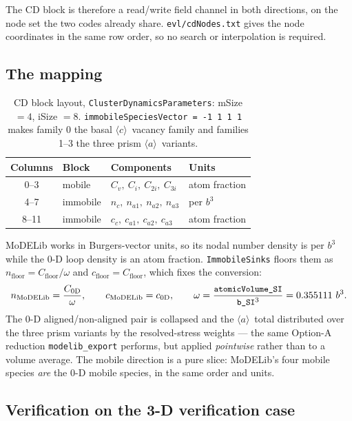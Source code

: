 \documentclass[11pt,a4paper]{article}
\newcommand{\code}[1]{\texttt{\small #1}}
\newcommand{\aloop}{\ensuremath{\langle a\rangle}}
\newcommand{\cloop}{\ensuremath{\langle c\rangle}}
\begin{document}
The CD block is therefore a read/write field channel in both directions, on the
node set the two codes already share. \code{evl/cdNodes.txt} gives the node
coordinates in the same row order, so no search or interpolation is required.

\subsection{The mapping}

\begin{table}[htb]
\centering
\caption{CD block layout, \code{ClusterDynamicsParameters}: mSize $=4$,
iSize $=8$. \code{immobileSpeciesVector = -1 1 1 1} makes family 0 the basal
\cloop\ vacancy family and families 1--3 the three prism \aloop\ variants.}
\begin{tabular}{clll}
\toprule
Columns & Block & Components & Units \\
\midrule
0--3   & mobile   & $C_v,\ C_i,\ C_{2i},\ C_{3i}$ & atom fraction \\
4--7   & immobile & $n_c,\ n_{a1},\ n_{a2},\ n_{a3}$ & per $b^3$ \\
8--11  & immobile & $c_c,\ c_{a1},\ c_{a2},\ c_{a3}$ & atom fraction \\
\bottomrule
\end{tabular}
\end{table}

MoDELib works in Burgers-vector units, so its nodal number density is per $b^3$
while the 0-D loop density is an atom fraction. \code{ImmobileSinks} floors them
as $n_{\mathrm{floor}}=C_{\mathrm{floor}}/\omega$ and
$c_{\mathrm{floor}}=C_{\mathrm{floor}}$, which fixes the conversion:
\begin{equation}
n_{\mathrm{MoDELib}}=\frac{C_{\mathrm{0D}}}{\omega},\qquad
c_{\mathrm{MoDELib}}=c_{\mathrm{0D}},\qquad
\omega=\frac{\code{atomicVolume\_SI}}{\code{b\_SI}^{3}}=0.355111\ b^{3}.
\end{equation}
The 0-D aligned/non-aligned pair is collapsed and the \aloop\ total distributed
over the three prism variants by the resolved-stress weights --- the same
Option-A reduction \code{modelib\_export} performs, but applied \emph{pointwise}
rather than to a volume average. The mobile direction is a pure slice: MoDELib's
four mobile species \emph{are} the 0-D mobile species, in the same order and
units.

\subsection{Verification on the 3-D verification case}
\end{document}
